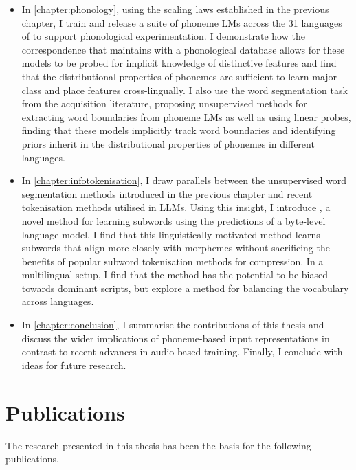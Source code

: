 \begin{itemize}
    \item In \cref{chapter:phonology}, using the scaling laws established in the previous chapter, I train and release a suite of phoneme LMs across the 31 languages of \ipachildes to support phonological experimentation. I demonstrate how the correspondence that \gpp maintains with a phonological database allows for these models to be probed for implicit knowledge of distinctive features and find that the distributional properties of phonemes are sufficient to learn major class and place features cross-lingually. I also use the word segmentation task from the acquisition literature, proposing unsupervised methods for extracting word boundaries from phoneme LMs as well as using linear probes, finding that these models implicitly track word boundaries and identifying priors inherit in the distributional properties of phonemes in different languages.
    \item In \cref{chapter:infotokenisation}, I draw parallels between the unsupervised word segmentation methods introduced in the previous chapter and recent tokenisation methods utilised in LLMs. Using this insight, I introduce \bytespan, a novel method for learning subwords using the predictions of a byte-level language model. I find that this linguistically-motivated method learns subwords that align more closely with morphemes without sacrificing the benefits of popular subword tokenisation methods for compression. In a multilingual setup, I find that the method has the potential to be biased towards dominant scripts, but explore a method for balancing the vocabulary across languages. 
    \item In \cref{chapter:conclusion}, I summarise the contributions of this thesis and discuss the wider implications of phoneme-based input representations in contrast to recent advances in audio-based training. Finally, I conclude with ideas for future research.
\end{itemize}

\section{Publications}

The research presented in this thesis has been the basis for the following publications.

